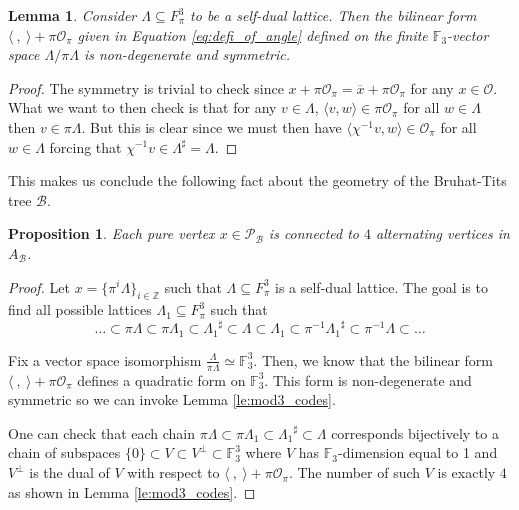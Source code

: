 \documentclass{eptcs}
\newtheorem{lemma}[theorem]{Lemma}
\newtheorem{proposition}[theorem]{Proposition}
\theoremstyle{remark}
\theoremstyle{definition}
\newcommand{\dual}[1]{{#1}^{\sharp}}
\begin{document}
\begin{lemma}
  \label{le:nondegen}
  Consider $\Lambda \subseteq F_{\pi}^{3}$ to be a self-dual lattice. Then the bilinear form $\langle \ , \ \rangle + \pi \mathcal{O}_{\pi}$ given in Equation \ref{eq:defi_of_angle} defined on the finite $\mathbb{F}_{3}$-vector space $\Lambda / \pi \Lambda$ is non-degenerate and symmetric.
\end{lemma}
\begin{proof}
    The symmetry is trivial to check since $x + \pi \mathcal{O}_{\pi} = \overline{x} + \pi\mathcal{O}_{\pi}$ for any $x \in \mathcal{O}$.
        What we want to then check is that for any $v \in \Lambda$, $\langle v ,w \rangle \in \pi \mathcal{O}_{\pi}$ for all $w \in \Lambda$ then $v \in \pi \Lambda$. But this is clear since we must then have $\langle \chi^{-1}  v , w \rangle \in \mathcal{O}_{\pi}$ for all $w \in \Lambda$ forcing that $\chi^{-1} v \in \dual{\Lambda} = \Lambda$.
\end{proof}

This makes us conclude the following fact about the geometry of the Bruhat-Tits tree $\mathcal{B}$.


\begin{proposition}
    Each pure vertex $x \in \mathcal{P}_{\mathcal{B}}$ is connected to $4$ alternating vertices in $A_{\mathcal{B}}$. 
\end{proposition}
\begin{proof}
    Let $x = \{\pi^{i} \Lambda \}_{i \in \mathbb{Z}}$ such that $\Lambda \subseteq {F}_{\pi}^{3}$ is a self-dual lattice. 
    The goal is to find all possible lattices $\Lambda_{1} \subseteq F_{\pi}^{3}$ such that 
\begin{equation}
    \dots \subset \pi \Lambda \subset \pi \Lambda_{1} \subset \dual{\Lambda_{1}} \subset \Lambda \subset \Lambda_{1} \subset \pi^{-1} \dual{\Lambda_{1}} \subset \pi^{-1} \Lambda \subset \dots
\end{equation}

Fix a vector space isomorphism $\frac{\Lambda}{\pi \Lambda} \simeq \mathbb{F}_{3}^{3}$. 
Then, we know that the bilinear form $\langle \ ,\ \rangle + \pi \mathcal{O}_{\pi}$
defines a quadratic form on $\mathbb{F}_{3}^{3}$. 
This form is non-degenerate and symmetric so we can invoke Lemma \ref{le:mod3_codes}. 


One can check that each chain $\pi \Lambda \subset \pi \Lambda_{1} \subset \dual{\Lambda_{1}} \subset \Lambda$ corresponds bijectively to a chain of subspaces $\{0\} \subset V \subset V^{\perp} \subset \mathbb{F}_{3}^3$ where $V$ has $\mathbb{F}_{3}$-dimension equal to 1 and $V^{\perp}$ is the dual of $V$ with respect to $\langle\ , \ \rangle + \pi \mathcal{O}_{\pi}$. 
The number of such $V$ is exactly $4$ as shown in Lemma \ref{le:mod3_codes}.

\end{proof}
\end{document}

